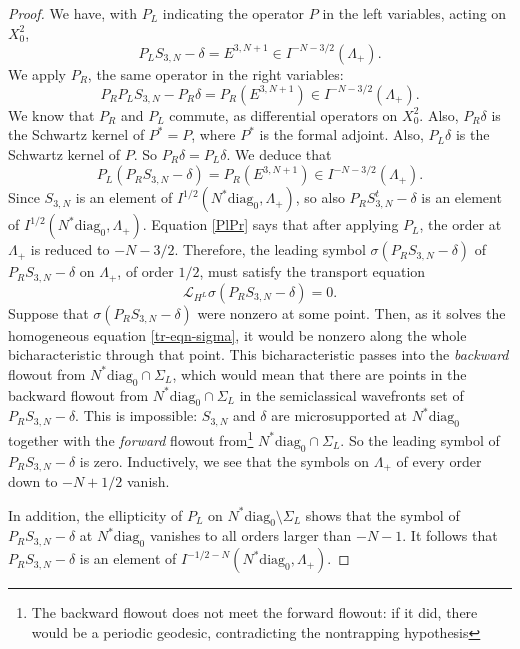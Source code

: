 \documentclass[10pt, a4paper, twoside]{amsart}
\numberwithin{equation}{section}
\theoremstyle{remark}
\begin{document}
\begin{proof}
We have, with $P_L$ indicating the operator $P$ in the left variables, acting on $X^2_0$, 
$$
P_L S_{3, N} - \delta = E^{3, N+1} \in I^{-N-3/2}(\Lambda_+).
$$
We apply $P_R$, the same operator in the right variables:
$$
P_R P_L S_{3, N} - P_R \delta = P_R (E^{3, N+1}) \in I^{-N-3/2}(\Lambda_+).
$$
We know that $P_R$ and $P_L$ commute, as differential operators on $X^2_0$. Also, $P_R \delta$ is the Schwartz kernel of $P^* = P$, where $P^*$ is the formal adjoint. Also, $P_L \delta$ is the Schwartz kernel of $P$. So $P_R \delta = P_L \delta$. We deduce that 
\begin{equation}
P_L (P_R S_{3, N} - \delta) = P_R (E^{3, N+1}) \in I^{-N-3/2}(\Lambda_+).
\label{PlPr}\end{equation}
Since $S_{3, N}$ is an element of $I^{1/2}(N^* {\mathrm{diag}_0}, \Lambda_+)$, so also $P_R S^t_{3, N} - \delta$ is an element of $I^{1/2}(N^* {\mathrm{diag}_0}, \Lambda_+)$. Equation \eqref{PlPr} says that after applying $P_L$, the order at $\Lambda_+$ is reduced to $-N-3/2$. Therefore, the leading symbol $\sigma(P_R S_{3, N} - \delta)$ of $P_R S_{3, N} - \delta$ on $\Lambda_+$,  of order $1/2$, must satisfy the transport equation 
\begin{equation}
\mathcal{L}_{H^L} \sigma(P_R S_{3, N} - \delta)  = 0 .
\label{tr-eqn-sigma}\end{equation}
Suppose that $\sigma(P_R S_{3, N} - \delta)$ were nonzero at some point. 
Then, as it solves the homogeneous equation \eqref{tr-eqn-sigma}, it would be nonzero along the whole bicharacteristic through that point. This bicharacteristic passes into the \emph{backward} flowout from $N^* {\mathrm{diag}_0} \cap \Sigma_L$, which would mean that there are points in the backward flowout from $N^* {\mathrm{diag}_0} \cap \Sigma_L$ in the semiclassical wavefronts set of $P_R S_{3, N} - \delta$. This is impossible: $S_{3, N}$ and $\delta$ are microsupported at $N^* {\mathrm{diag}_0}$ together with the \emph{forward} flowout from\footnote{The backward flowout does not meet the forward flowout: if it did, there would be a periodic geodesic, contradicting the nontrapping hypothesis} $N^* {\mathrm{diag}_0} \cap \Sigma_L$. So the leading symbol of $P_R S_{3, N} - \delta$ is zero. Inductively, we see that the symbols on $\Lambda_+$ of every order down to $-N+1/2$ vanish. 

In addition, the ellipticity of $P_L$ on $N^* {\mathrm{diag}_0} \setminus \Sigma_L$ shows that the symbol of $P_R S_{3, N} - \delta$ at $N^* {\mathrm{diag}_0}$ vanishes to all orders larger than $-N-1$. It follows that $P_R S_{3, N} - \delta$ is an element of $I^{-1/2-N}(N^* {\mathrm{diag}_0}, \Lambda_+)$.


\end{proof}
\end{document}
